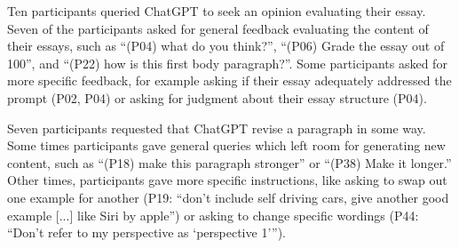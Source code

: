 \documentclass[manuscript,screen,acmsmall]{acmart}
\begin{document}

    Ten participants queried ChatGPT to seek an opinion evaluating their essay.
    Seven of the participants asked for general feedback evaluating the content of their essays, such as ``(P04) what do you think?'', ``(P06) Grade the essay out of 100'', and ``(P22) how is this first body paragraph?''.
    Some participants asked for more specific feedback, for example asking if their essay adequately addressed the prompt (P02, P04) or asking for judgment about their essay structure (P04).


    Seven participants requested that ChatGPT revise a paragraph in some way. 
    Some times participants gave general queries which left room for generating new content, such as ``(P18) make this paragraph stronger'' or ``(P38) Make it longer.''
    Other times, participants gave more specific instructions, like asking to swap out one example for another (P19: ``don't include self driving cars, give another good example [...] like Siri by apple'')
    or asking to change specific wordings (P44: ``Don't refer to my perspective as `perspective 1''').
    

    
\end{document}
